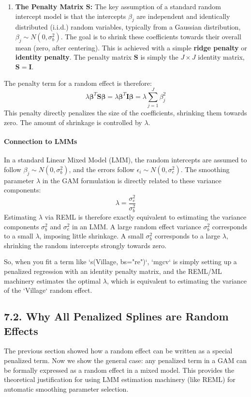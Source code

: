 \documentclass[11pt, a4paper]{article}
\begin{document}
\begin{itemize}
\begin{enumerate}
    \item \textbf{The Penalty Matrix $\mathbf{S}$:} The key assumption of a standard random intercept model is that the intercepts $\beta_j$ are independent and identically distributed (i.i.d.) random variables, typically from a Gaussian distribution, $\beta_j \sim N(0, \sigma_b^2)$. The goal is to shrink these coefficients towards their overall mean (zero, after centering). This is achieved with a simple \textbf{ridge penalty} or \textbf{identity penalty}. The penalty matrix $\mathbf{S}$ is simply the $J \times J$ identity matrix, $\mathbf{S} = \mathbf{I}$.
\end{enumerate}
The penalty term for a random effect is therefore:
\[ \lambda \boldsymbol{\beta}^T \mathbf{S} \boldsymbol{\beta} = \lambda \boldsymbol{\beta}^T \mathbf{I} \boldsymbol{\beta} = \lambda \sum_{j=1}^{J} \beta_j^2 \]
This penalty directly penalizes the size of the coefficients, shrinking them towards zero. The amount of shrinkage is controlled by $\lambda$.

\paragraph{Connection to LMMs}
In a standard Linear Mixed Model (LMM), the random intercepts are assumed to follow $\beta_j \sim N(0, \sigma_b^2)$, and the errors follow $\epsilon_i \sim N(0, \sigma_e^2)$. The smoothing parameter $\lambda$ in the GAM formulation is directly related to these variance components:
\[ \lambda = \frac{\sigma_e^2}{\sigma_b^2} \]
Estimating $\lambda$ via REML is therefore exactly equivalent to estimating the variance components $\sigma_b^2$ and $\sigma_e^2$ in an LMM. A large random effect variance $\sigma_b^2$ corresponds to a small $\lambda$, imposing little shrinkage. A small $\sigma_b^2$ corresponds to a large $\lambda$, shrinking the random intercepts strongly towards zero.

So, when you fit a term like `s(Village, bs="re")`, `mgcv` is simply setting up a penalized regression with an identity penalty matrix, and the REML/ML machinery estimates the optimal $\lambda$, which is equivalent to estimating the variance of the `Village` random effect.

\subsection{7.2. Why All Penalized Splines are Random Effects}
The previous section showed how a random effect can be written as a special penalized term. Now we show the general case: any penalized term in a GAM can be formally expressed as a random effect in a mixed model. This provides the theoretical justification for using LMM estimation machinery (like REML) for automatic smoothing parameter selection.


\end{itemize}
\end{document}
